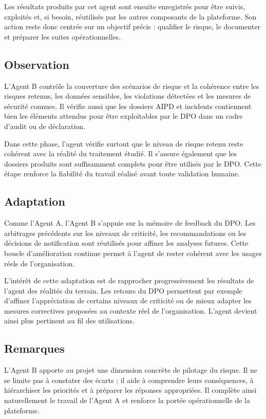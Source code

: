 \documentclass[12pt,a4paper]{report}
\begin{document}
Les résultats produits par cet agent sont ensuite enregistrés pour être suivis, exploités et, si besoin, réutilisés par les autres composants de la plateforme. Son action reste donc centrée sur un objectif précis : qualifier le risque, le documenter et préparer les suites opérationnelles.

\subsection{Observation}

L'Agent B contrôle la couverture des scénarios de risque et la cohérence entre les risques retenus, les données sensibles, les violations détectées et les mesures de sécurité connues. Il vérifie aussi que les dossiers AIPD et incidents contiennent bien les éléments attendus pour être exploitables par le DPO dans un cadre d'audit ou de déclaration.

Dans cette phase, l'agent vérifie surtout que le niveau de risque retenu reste cohérent avec la réalité du traitement étudié. Il s'assure également que les dossiers produits sont suffisamment complets pour être utilisés par le DPO. Cette étape renforce la fiabilité du travail réalisé avant toute validation humaine.

\subsection{Adaptation}

Comme l'Agent A, l'Agent B s'appuie sur la mémoire de feedback du DPO. Les arbitrages précédents sur les niveaux de criticité, les recommandations ou les décisions de notification sont réutilisés pour affiner les analyses futures. Cette boucle d'amélioration continue permet à l'agent de rester cohérent avec les usages réels de l'organisation.

L'intérêt de cette adaptation est de rapprocher progressivement les résultats de l'agent des réalités du terrain. Les retours du DPO permettent par exemple d'affiner l'appréciation de certains niveaux de criticité ou de mieux adapter les mesures correctives proposées au contexte réel de l'organisation. L'agent devient ainsi plus pertinent au fil des utilisations.

\subsection{Remarques}

L'Agent B apporte au projet une dimension concrète de pilotage du risque. Il ne se limite pas à constater des écarts ; il aide à comprendre leurs conséquences, à hiérarchiser les priorités et à préparer les réponses appropriées. Il complète ainsi naturellement le travail de l'Agent A et renforce la portée opérationnelle de la plateforme.
\end{document}
